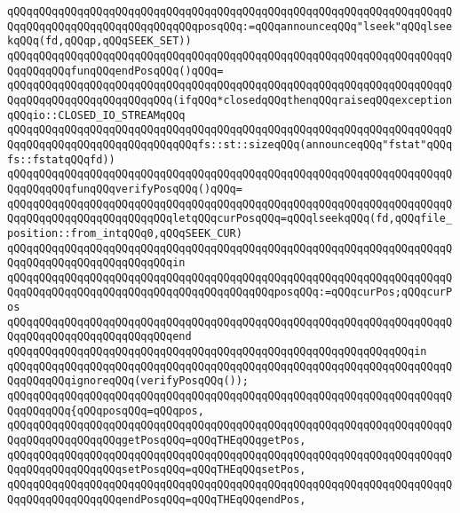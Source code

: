 \verb|qQQqqQQqqQQqqQQqqQQqqQQqqQQqqQQqqQQqqQQqqQQqqQQqqQQqqQQqqQQqqQQqqQQqqQQqqQQqqQQqqQQqqQQqqQQqqQQqqQQqposqQQq:=qQQqannounceqQQq"lseek"qQQqlseekqQQq(fd,qQQqp,qQQqSEEK_SET))|\newline
\verb|qQQqqQQqqQQqqQQqqQQqqQQqqQQqqQQqqQQqqQQqqQQqqQQqqQQqqQQqqQQqqQQqqQQqqQQqqQQqqQQqfunqQQqendPosqQQq()qQQq=|\newline
\verb|qQQqqQQqqQQqqQQqqQQqqQQqqQQqqQQqqQQqqQQqqQQqqQQqqQQqqQQqqQQqqQQqqQQqqQQqqQQqqQQqqQQqqQQqqQQqqQQq(ifqQQq*closedqQQqthenqQQqraiseqQQqexceptionqQQqio::CLOSED_IO_STREAMqQQq|\newline
\verb|qQQqqQQqqQQqqQQqqQQqqQQqqQQqqQQqqQQqqQQqqQQqqQQqqQQqqQQqqQQqqQQqqQQqqQQqqQQqqQQqqQQqqQQqqQQqqQQqqQQqfs::st::sizeqQQq(announceqQQq"fstat"qQQqfs::fstatqQQqfd))|\newline
\verb|qQQqqQQqqQQqqQQqqQQqqQQqqQQqqQQqqQQqqQQqqQQqqQQqqQQqqQQqqQQqqQQqqQQqqQQqqQQqqQQqfunqQQqverifyPosqQQq()qQQq=|\newline
\verb|qQQqqQQqqQQqqQQqqQQqqQQqqQQqqQQqqQQqqQQqqQQqqQQqqQQqqQQqqQQqqQQqqQQqqQQqqQQqqQQqqQQqqQQqqQQqqQQqletqQQqcurPosqQQq=qQQqlseekqQQq(fd,qQQqfile_position::from_intqQQq0,qQQqSEEK_CUR)|\newline
\verb|qQQqqQQqqQQqqQQqqQQqqQQqqQQqqQQqqQQqqQQqqQQqqQQqqQQqqQQqqQQqqQQqqQQqqQQqqQQqqQQqqQQqqQQqqQQqqQQqin|\newline
\verb|qQQqqQQqqQQqqQQqqQQqqQQqqQQqqQQqqQQqqQQqqQQqqQQqqQQqqQQqqQQqqQQqqQQqqQQqqQQqqQQqqQQqqQQqqQQqqQQqqQQqqQQqqQQqqQQqposqQQq:=qQQqcurPos;qQQqcurPos|\newline
\verb|qQQqqQQqqQQqqQQqqQQqqQQqqQQqqQQqqQQqqQQqqQQqqQQqqQQqqQQqqQQqqQQqqQQqqQQqqQQqqQQqqQQqqQQqqQQqqQQqend|\newline
\verb|qQQqqQQqqQQqqQQqqQQqqQQqqQQqqQQqqQQqqQQqqQQqqQQqqQQqqQQqqQQqqQQqin|\newline
\verb|qQQqqQQqqQQqqQQqqQQqqQQqqQQqqQQqqQQqqQQqqQQqqQQqqQQqqQQqqQQqqQQqqQQqqQQqqQQqqQQqignoreqQQq(verifyPosqQQq());|\newline
\verb|qQQqqQQqqQQqqQQqqQQqqQQqqQQqqQQqqQQqqQQqqQQqqQQqqQQqqQQqqQQqqQQqqQQqqQQqqQQqqQQq{qQQqposqQQq=qQQqpos,|\newline
\verb|qQQqqQQqqQQqqQQqqQQqqQQqqQQqqQQqqQQqqQQqqQQqqQQqqQQqqQQqqQQqqQQqqQQqqQQqqQQqqQQqqQQqqQQqgetPosqQQq=qQQqTHEqQQqgetPos,|\newline
\verb|qQQqqQQqqQQqqQQqqQQqqQQqqQQqqQQqqQQqqQQqqQQqqQQqqQQqqQQqqQQqqQQqqQQqqQQqqQQqqQQqqQQqqQQqsetPosqQQq=qQQqTHEqQQqsetPos,|\newline
\verb|qQQqqQQqqQQqqQQqqQQqqQQqqQQqqQQqqQQqqQQqqQQqqQQqqQQqqQQqqQQqqQQqqQQqqQQqqQQqqQQqqQQqqQQqendPosqQQq=qQQqTHEqQQqendPos,|\newline
